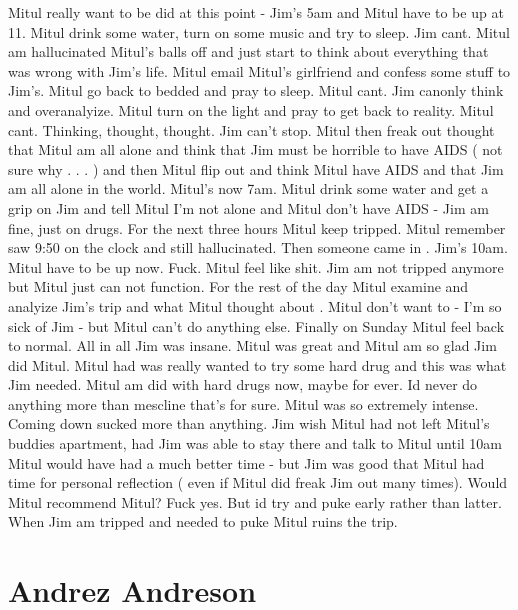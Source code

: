 \documentclass[12pt]{book}
\begin{document}
Mitul really want to be did at this point - Jim's 5am and Mitul have to be up at 11. Mitul drink some water, turn on some music and try to sleep. Jim cant. Mitul am hallucinated Mitul's balls off and just start to think about everything that was wrong with Jim's life. Mitul email Mitul's girlfriend and confess some stuff to Jim's. Mitul go back to bedded and pray to sleep. Mitul cant. Jim canonly think and overanalyize. Mitul turn on the light and pray to get back to reality. Mitul cant. Thinking, thought, thought. Jim can't stop. Mitul then freak out thought that Mitul am all alone and think that Jim must be horrible to have AIDS ( not sure why . . .   ) and then Mitul flip out and think Mitul have AIDS and that Jim am all alone in the world. Mitul's now 7am. Mitul drink some water and get a grip on Jim and tell Mitul I'm not alone and Mitul don't have AIDS - Jim am fine, just on drugs. For the next three hours Mitul keep tripped. Mitul remember saw 9:50 on the clock and still hallucinated. Then someone came in . Jim's 10am. Mitul have to be up now. Fuck. Mitul feel like shit. Jim am not tripped anymore but Mitul just can not function. For the rest of the day Mitul examine and analyize Jim's trip and what Mitul thought about . Mitul don't want to - I'm so sick of Jim - but Mitul can't do anything else. Finally on Sunday Mitul feel back to normal. All in all Jim was insane. Mitul was great and Mitul am so glad Jim did Mitul. Mitul had was really wanted to try some hard drug and this was what Jim needed. Mitul am did with hard drugs now, maybe for ever. Id never do anything more than mescline that's for sure. Mitul was so extremely intense. Coming down sucked more than anything. Jim wish Mitul had not left Mitul's buddies apartment, had Jim was able to stay there and talk to Mitul until 10am Mitul would have had a much better time - but Jim was good that Mitul had time for personal reflection ( even if Mitul did freak Jim out many times). Would Mitul recommend Mitul? Fuck yes. But id try and puke early rather than latter. When Jim am tripped and needed to puke Mitul ruins the trip.



\chapter{Andrez Andreson}
\end{document}
